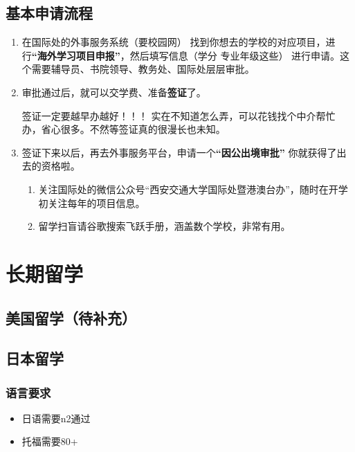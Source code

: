 \documentclass[zihao=-4,fontset=none]{Beautybook-CN}
\begin{document}
\subsection{基本申请流程}
\begin{enumerate}
    \item 在国际处的外事服务系统（要校园网） 找到你想去的学校的对应项目，进行\textbf{“海外学习项目申报”}，然后填写信息（学分 专业年级这些） 进行申请。这个需要辅导员、书院领导、教务处、国际处层层审批。
\item 审批通过后，就可以交学费、准备\textbf{签证}了。
\begin{theorem}
    签证一定要越早办越好！！！ 实在不知道怎么弄，可以花钱找个中介帮忙办，省心很多。不然等签证真的很漫长也未知。
\end{theorem}
\item 签证下来以后，再去外事服务平台，申请一个\textbf{“因公出境审批”} 你就获得了出去的资格啦。
\begin{example}
    \begin{enumerate}
        \item 关注国际处的微信公众号“西安交通大学国际处暨港澳台办”，随时在开学初关注每年的项目信息。
        \item 留学扫盲请谷歌搜索飞跃手册，涵盖数个学校，非常有用。
    \end{enumerate}
    
\end{example}
\end{enumerate}
\section{长期留学}
\subsection{美国留学（待补充）}
\subsection{日本留学}

\subsubsection{语言要求}
\begin{itemize}
\item 日语需要n2通过
\item 托福需要80+
\end{itemize}
\end{document}
